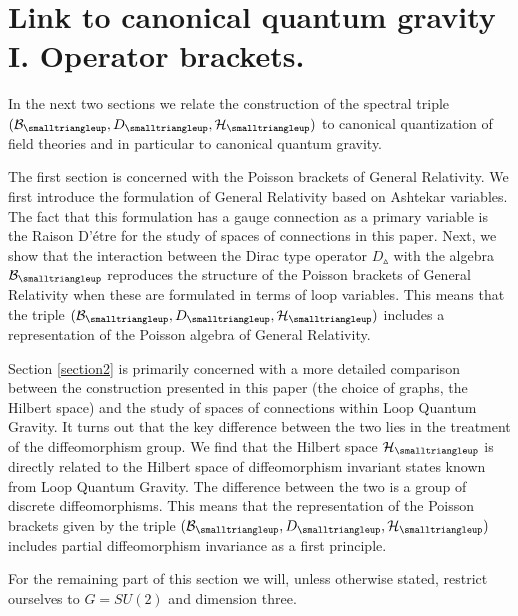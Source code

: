 \documentclass[12pt]{article}
\def\cb{{\cal B}}
\def\ch{{\cal H}}
\begin{document}
\section{Link to canonical quantum gravity I. Operator brackets.}
\label{cangrav}

In the next two sections we relate the construction of the spectral triple $(\cb_{\smalltriangleup},D_{\smalltriangleup},\ch_\smalltriangleup)$ to canonical quantization of field theories and in particular to canonical quantum gravity. 

The first section is concerned with the Poisson brackets of General Relativity. 
We first introduce the formulation of General Relativity based on Ashtekar variables. The fact that this formulation has a gauge connection as a primary variable is the Raison D'\'{e}tre for the study of spaces of connections in this paper.
Next, we show that the interaction between the Dirac type operator $D_{\smalltriangleup}$ with the algebra $\cb_{\smalltriangleup}$ reproduces the structure of the Poisson brackets of General Relativity when these are formulated in terms of loop variables. This means that the triple $(\cb_{\smalltriangleup},D_{\smalltriangleup},\ch_\smalltriangleup)$ includes a representation of the Poisson algebra of General Relativity. 

Section \ref{section2} is primarily concerned with a more detailed comparison between the construction presented in this paper (the choice of graphs, the Hilbert space) and the study of spaces of connections within Loop Quantum Gravity. It turns out that the key difference between the two lies in the treatment of the diffeomorphism group. We find that the Hilbert space $\ch_\smalltriangleup$ is directly related to the Hilbert space of diffeomorphism invariant states known from Loop Quantum Gravity. The difference between the two is a group of discrete diffeomorphisms. This means that the representation of the Poisson brackets given by the triple $(\cb_{\smalltriangleup},D_{\smalltriangleup},\ch_\smalltriangleup)$ includes partial diffeomorphism invariance as a first principle. 

 For the remaining part of this section we will, unless otherwise stated, restrict ourselves to $G=SU(2)$ and dimension three. 
\end{document}
